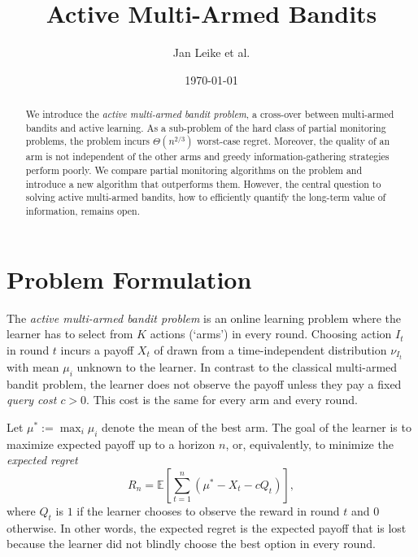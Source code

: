 \documentclass[a4paper]{article}
\begin{document}

\title{Active Multi-Armed Bandits}
\author{Jan Leike et al.}
\date{\today}

\maketitle


\begin{abstract}%
We introduce the \emph{active multi-armed bandit problem},
a cross-over between multi-armed bandits and active learning.
As a sub-problem of the hard class of partial monitoring problems,
the problem incurs $\Theta(n^{2/3})$ worst-case regret.
Moreover,
the quality of an arm is not independent of the other arms
and greedy information-gathering strategies perform poorly.
We compare partial monitoring algorithms on the problem and
introduce a new algorithm that outperforms them.
However,
the central question to solving active multi-armed bandits,
how to efficiently quantify the long-term value of information,
remains open.
\end{abstract}


\section{Problem Formulation}

The \emph{active multi-armed bandit problem} is
an online learning problem
where the learner has to select from $K$ actions (`arms') in every round.
Choosing action $I_t$ in round $t$ incurs a payoff
$X_t$ of drawn from a time-independent distribution $\nu_{I_t}$ with mean $\mu_i$
unknown to the learner.
In contrast to the classical multi-armed bandit problem,
the learner does not observe the payoff
unless they pay a fixed \emph{query cost $c > 0$}.
This cost is the same for every arm and every round.

Let $\mu^* := \max_i \mu_i$ denote the mean of the best arm.
The goal of the learner is to maximize expected payoff up to a horizon $n$,
or, equivalently, to minimize the \emph{expected regret}
\[
R_n = \mathbb{E} \left[ \sum_{t=1}^n (\mu^* - X_t - c Q_t) \right],
\]
where $Q_t$ is $1$ if the learner chooses to observe the reward in round $t$ and $0$ otherwise.
In other words, the expected regret is the expected payoff
that is lost
because the learner did not blindly choose the best option in every round.
\end{document}
